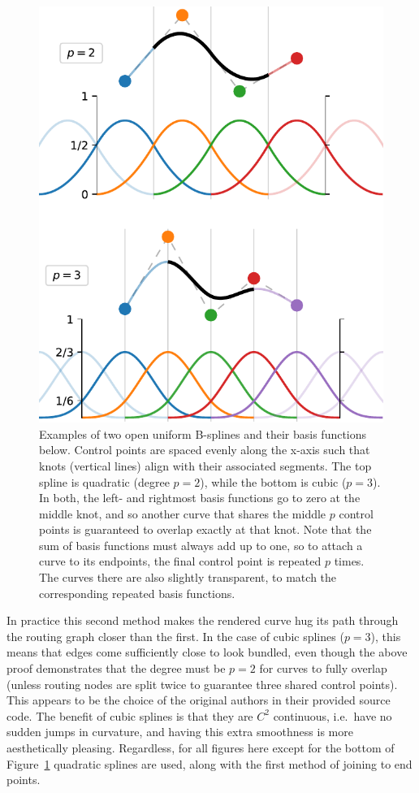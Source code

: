 \begin{figure}
  \centering
  \includegraphics[width=.9\linewidth]{power/basis.pdf}
  \caption[B-spline basis functions]{Examples of two open uniform B-splines and their basis functions below. Control points are spaced evenly along the x-axis such that knots (vertical lines) align with their associated segments. The top spline is quadratic (degree $p=2$), while the bottom is cubic ($p=3$). In both, the left- and rightmost basis functions go to zero at the middle knot, and so another curve that shares the middle $p$ control points is guaranteed to overlap exactly at that knot. Note that the sum of basis functions must always add up to one, so to attach a curve to its endpoints, the final control point is repeated $p$ times. The curves there are also slightly transparent, to match the corresponding repeated basis functions.}
  \label{fig:basis}
\end{figure}

In practice this second method makes the rendered curve hug its path through the routing graph closer than the first. In the case of cubic splines ($p=3$), this means that edges come sufficiently close to look bundled, even though the above proof demonstrates that the degree must be $p=2$ for curves to fully overlap (unless routing nodes are split twice to guarantee three shared control points).
This appears to be the choice of the original authors \cite{Bach2017} in their provided source code.
The benefit of cubic splines is that they are $C^2$ continuous, i.e.\  have no sudden jumps in curvature, and having this extra smoothness is more aesthetically pleasing. Regardless, for all figures here except for the bottom of Figure~\ref{fig:basis} quadratic splines are used, along with the first method of joining to end points.

